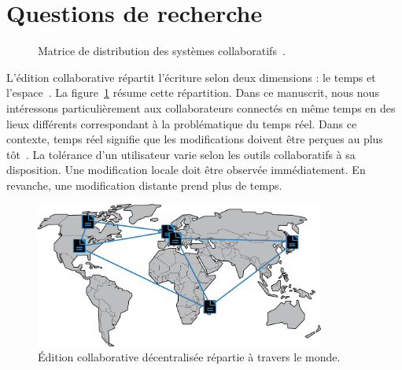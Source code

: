 
\section{Questions de recherche}


\begin{figure}
  \begin{center}
    
    \caption[Matrice de distribution des systèmes collaboratifs] {
      \label{editor:fig:groupware} Matrice de distribution des systèmes
      collaboratifs~\cite{johansen1988groupware}.}
  \end{center}
\end{figure}

L'édition collaborative répartit l'écriture selon deux dimensions : le temps et
l'espace~\cite{desanctis1987foundation, grudin1994computersupported,
  johansen1988groupware}.  La figure~\ref{editor:fig:groupware} résume cette
répartition. Dans ce manuscrit, nous nous intéressons particulièrement aux
collaborateurs connectés en même temps en des lieux différents 
correspondant à la problématique du temps réel. Dans ce contexte, \og temps réel
\fg signifie que les modifications doivent être perçues au plus
tôt~\cite{ellis1989concurrency}. La tolérance d'un utilisateur varie selon les
outils collaboratifs à sa disposition. Une modification locale doit être
observée immédiatement. En revanche, une modification distante prend plus de
temps.

\begin{figure}
  \begin{center}
    \includegraphics[width=0.85\textwidth]{img/world.png}
    \caption[Édition collaborative décentralisée]{\label{intro:img:world}Édition
      collaborative décentralisée répartie à travers le monde.}
  \end{center}
\end{figure}

